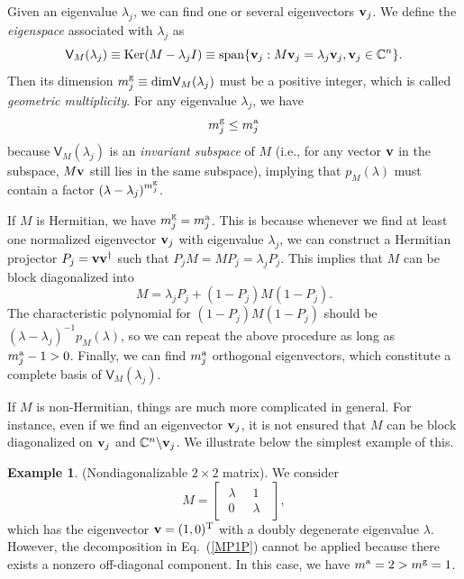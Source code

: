 \documentclass{tADP2e}
\theoremstyle{plain}
\theoremstyle{plain}
\theoremstyle{definition}
\newtheorem{example}{Example}[section]
\newcommand{\exmp}[1]{
\begin{example}
	#1
\end{example}
}
\begin{document}
\vspace{3pt}
\noindent
Given an eigenvalue $\lambda_j$, we can find one or several eigenvectors $\bold{v}_j$. We define the \emph{eigenspace} associated with $\lambda_{j}$ as
\begin{equation}
\textsf{V}_M(\lambda_j)\equiv{\rm Ker}(M-\lambda_jI)\equiv {\rm span}\{\bold{v}_j:M\bold{v}_j=\lambda_j\bold{v}_j,\bold{v}_j\in\mathbb{C}^n\}. 
\label{VM}
\end{equation}
Then its dimension $m^{\rm g}_j\equiv{\rm dim}\textsf{V}_M(\lambda_j)$ must be a positive integer, which is called \emph{geometric multiplicity}. For any eigenvalue $\lambda_j$, we have
\begin{equation}
m^{\rm g}_j\le m^{\rm a}_j
\end{equation}
because $\textsf{V}_M(\lambda_j)$ is an \emph{invariant subspace} of $M$ (i.e., for any vector $\bold{v}$ in the subspace, $M\bold{v}$ still lies in the same subspace), implying that $p_M(\lambda)$ must contain a factor $(\lambda-\lambda_j)^{m^{\rm g}_j}$.

If $M$ is Hermitian, we have $m^{\rm g}_j=m^{\rm a}_j$. This is because whenever we find at least one normalized eigenvector $\bold{v}_j$ with eigenvalue $\lambda_j$, we can construct a Hermitian projector $P_j=\bold{v}\bold{v}^\dag$ such that $P_jM=MP_j=\lambda_j P_j$. This implies that $M$ can be block diagonalized into
\begin{equation}
M=\lambda_j P_j+(1-P_j)M(1-P_j).
\label{MP1P}
\end{equation}
The characteristic polynomial for $(1-P_j)M(1-P_j)$ should be $(\lambda-\lambda_j)^{-1}p_M(\lambda)$, so we can repeat the above procedure as long as $m^{\rm a}_j-1>0$. Finally, we can find $m^{\rm a}_j$ orthogonal eigenvectors, which constitute a complete basis of $\textsf{V}_M(\lambda_j)$. 

If $M$ is non-Hermitian, things are much more complicated in general. For instance, even if we find an eigenvector $\bold{v}_j$, it is not ensured that $M$ can be block diagonalized on $\bold{v}_j$ and $\mathbb{C}^n\backslash\bold{v}_j$. We illustrate below the simplest example of this.

\exmp{\label{minimalnond}(Nondiagonalizable $2\times 2$ matrix).
We consider
\begin{equation}
M=\begin{bmatrix} \;\lambda\; & \;1\;\; \\ \;0\; & \;\lambda\;\; \end{bmatrix},
\label{Mlam}
\end{equation}
which has the eigenvector $\bold{v}=(1,0)^{\rm T}$ with a doubly degenerate eigenvalue $\lambda$. However, the decomposition in Eq.~(\ref{MP1P}) cannot be applied because there exists a nonzero off-diagonal component. In this case, we have $m^{\rm a}=2>m^{\rm g}=1$.
} 
\end{document}
